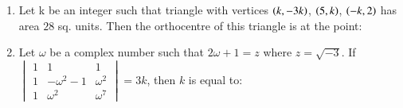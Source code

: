 \documentclass[journal,12pt,twocolumn]{IEEEtran}
\theoremstyle{remark}
\begin{document}
\begin{enumerate}
	\item Let k be an integer such that triangle with vertices $\left(k, -3k\right)$, $\left(5,k\right)$, $\left(-k,2\right)$ has area $28$ sq. units. Then the orthocentre of this triangle is at the point:
	\hfill{}
	\begin{enumerate}[label={(\alph*)}]
	    \begin{multicols}{2}
	     	\item $\brak{1,\frac{3}{4}}$ 
                \columnbreak
	    	\item $\brak{1,\frac{-3}{4}}$ 
            \end{multicols}
	\end{enumerate}


    \item Let $\omega$ be a complex number such that $2\omega + 1 = z$ where $z = \sqrt{-3}$. If
	    $\begin{vmatrix}1&1&1\\1&-\omega^2-1&\omega^2\\1&\omega^2&\omega^7\end{vmatrix} = 3k$, then $k$ is equal to:
	\hfill{}
	\begin{enumerate}[label={(\alph*)}]


	\end{enumerate}




\end{enumerate}
\end{document}
